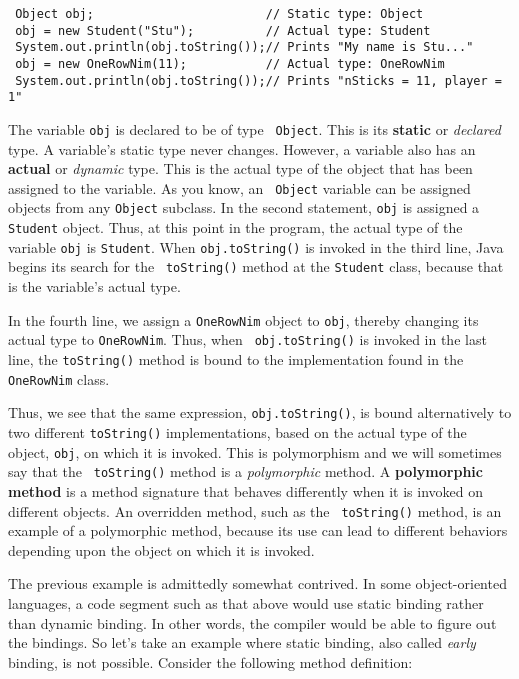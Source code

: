\begin{jjjlisting}[32pc]
\begin{lstlisting}
 Object obj;                        // Static type: Object
 obj = new Student("Stu");          // Actual type: Student
 System.out.println(obj.toString());// Prints "My name is Stu..."
 obj = new OneRowNim(11);           // Actual type: OneRowNim
 System.out.println(obj.toString());// Prints "nSticks = 11, player = 1"
\end{lstlisting}
\end{jjjlisting}

\noindent The variable {\tt obj} is declared to be of type {\tt
Object}.  This is its {\bf static} or {\em declared} type.  A
variable's static type never changes.  However, a variable also has an
{\bf actual} or {\em dynamic} type.  This is the actual type of the
object that has been assigned to the variable.  As you know, an {\tt
Object} variable can be assigned objects from any {\tt Object}
subclass.  In the second statement, {\tt obj} is assigned a {\tt
Student} object.  Thus, at this point in the program, the actual type
of the variable {\tt obj} is {\tt Student}.  When {\tt obj.toString()}
is invoked in the third line, Java begins its search for the {\tt
toString()} method at the {\tt Student} class, because that is the
variable's actual type.

In the fourth line, we assign a {\tt OneRowNim} object to {\tt obj},
thereby changing its actual type to {\tt OneRowNim}.  Thus, when {\tt
obj.toString()} is invoked in the last line, the {\tt toString()}
method is bound to the implementation found in the {\tt OneRowNim}
class.

Thus, we see that the same expression, {\tt obj.toString()}, is bound
alternatively to two different {\tt toString()} implementations, based
on the actual type of the object, {\tt obj}, on which it is invoked.
This is polymorphism and we will sometimes say that the {\tt
{}
toString()} method is a {\em polymorphic} method. A {\bf polymorphic
method} is a method signature that behaves differently when it is
invoked on different objects.  An overridden method, such as the {\tt
toString()} method, is an example of a polymorphic method,
because its use can lead to different behaviors depending upon the
object on which it is invoked.

The previous example is admittedly somewhat contrived. In some
object-oriented languages, a code segment such as that above would use
static binding rather than dynamic binding. In other words, the
compiler would be able to figure out the bindings.  So let's take an
example where static binding, also called {\em early} binding, is not
possible. Consider the following method definition:


